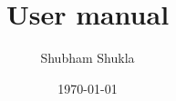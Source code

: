 \documentclass[11]{article}
\begin{document}
\title{User manual}
\author{Shubham Shukla}
\date{\today}
\maketitle
\end{document}
